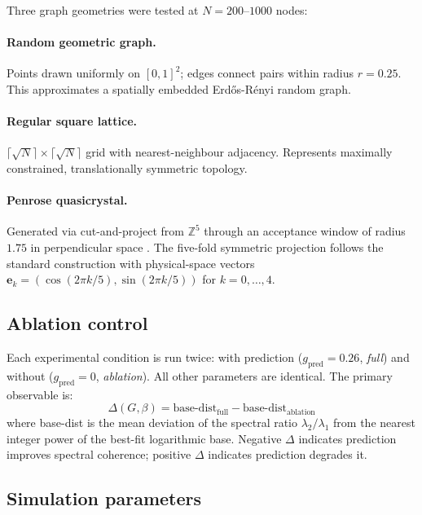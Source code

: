 \documentclass[12pt,a4paper]{article}
\theoremstyle{plain}
\theoremstyle{definition}
\renewcommand{\vec}[1]{\bm{#1}}
\begin{document}
Three graph geometries were tested at $N = 200$--$1000$ nodes:

\paragraph{Random geometric graph.}
Points drawn uniformly on $[0,1]^2$; edges connect pairs within
radius $r = 0.25$. This approximates a spatially embedded Erd\H{o}s-R\'enyi
random graph.

\paragraph{Regular square lattice.}
$\lceil\sqrt{N}\rceil \times \lceil\sqrt{N}\rceil$ grid with nearest-neighbour
adjacency. Represents maximally constrained, translationally symmetric topology.

\paragraph{Penrose quasicrystal.}
Generated via cut-and-project from $\mathbb{Z}^5$ through an acceptance
window of radius $1.75$ in perpendicular space
\citep{penrose1974,debruijn1981}. The five-fold symmetric
projection follows the standard construction with physical-space vectors
$\vec{e}_k = (\cos(2\pi k/5), \sin(2\pi k/5))$ for $k = 0,\ldots,4$.

\subsection{Ablation control}

Each experimental condition is run twice: with prediction
($g_{\text{pred}} = 0.26$, \emph{full}) and without
($g_{\text{pred}} = 0$, \emph{ablation}). All other parameters are
identical. The primary observable is:
\begin{equation}
\Delta(G,\beta) = \text{base-dist}_{\text{full}} -
  \text{base-dist}_{\text{ablation}}
\end{equation}
where base-dist is the mean deviation of the spectral ratio $\lambda_2/\lambda_1$
from the nearest integer power of the best-fit logarithmic base. Negative
$\Delta$ indicates prediction improves spectral coherence; positive $\Delta$
indicates prediction degrades it.

\subsection{Simulation parameters}
\end{document}
